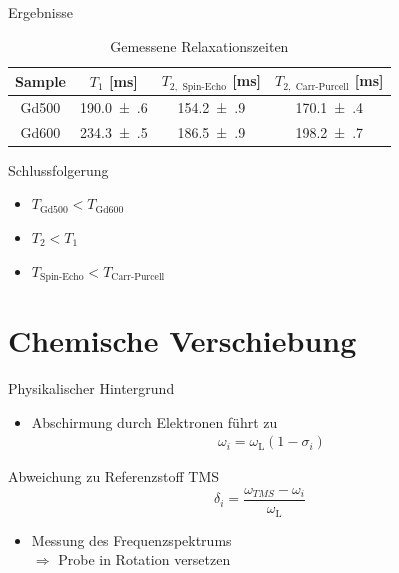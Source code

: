 \begin{frame}{Ergebnisse}
	\begin{table}
	\centering
	\begin{tabular}{cccc}
	\toprule
	Sample & $T_1$ [ms] & $T_{2,\text{ Spin-Echo}}$ [ms] & $T_{2,\text{ Carr-Purcell}}$ [ms]\\
	\midrule
	Gd500 & \num{190.0(6)} & \num{154.2(9)} & \num{170.1(4)}\\
	Gd600 & \num{234.3(5)} & \num{186.5(9)} & \num{198.2(7)}\\
	\bottomrule
	\end{tabular}
	\caption{Gemessene Relaxationszeiten}
	\end{table}
	\begin{block}{Schlussfolgerung}
	\begin{itemize}
	\item $T_\text{Gd500} < T_\text{Gd600}$
	\item $T_2 < T_1$
	\item $T_\text{Spin-Echo} < T_\text{Carr-Purcell}$
	\end{itemize}
	\end{block}
\end{frame}




\section{Chemische Verschiebung}

\begin{frame}{Physikalischer Hintergrund}
	\begin{itemize}
	\item Abschirmung durch Elektronen führt zu
	\begin{align*}
	\omega_i=\omega_\text{L}(1-\sigma_i)
	\end{align*}
	\end{itemize}
	\begin{block}{Abweichung zu Referenzstoff TMS}
	\[
	\delta_i=\frac{\omega_{TMS}-\omega_i}{\omega_\text{L}}
	\]
	\end{block}
	\begin{itemize}
	\item Messung des Frequenzspektrums\\
	$\Rightarrow$ Probe in Rotation versetzen
	\end{itemize}
\end{frame}

